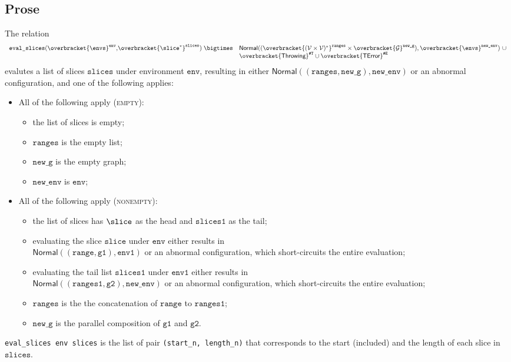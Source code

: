 \documentclass{book}
\newcommand\overname[2]{\overbracket{#1}^{#2}}
\newcommand\XGraphs[0]{\mathcal{G}}
\newcommand\vals[0]{\mathcal{V}}
\newcommand\aslrel[0]{\bigtimes}
\newcommand\aslsep[0]{\mathbf{,}}
\newcommand\ThrowingConfig[0]{\texttt{\#T}}
\newcommand\ErrorConfig[0]{\texttt{\#E}}
\newcommand\ProseOrAbnormal[0]{or an abnormal configuration, which short-circuits the entire evaluation}
\newcommand\TError[0]{\textsf{TError}}
\newcommand\evalslices[1]{\texttt{eval\_slices}(#1)}
\newcommand\Normal[0]{\textsf{Normal}}
\newcommand\Throwing[0]{\textsf{Throwing}}
\newcommand\newenv[0]{\texttt{new\_env}}
\newcommand\env[0]{\texttt{env}}
\newcommand\envone[0]{\texttt{env1}}
\newcommand\newg[0]{\texttt{new\_g}}
\newcommand\vgone[0]{\texttt{g1}}
\newcommand\vgtwo[0]{\texttt{g2}}
\newcommand\vslice[0]{\texttt{slice}}
\newcommand\slices[0]{\texttt{slices}}
\newcommand\slicesone[0]{\texttt{slices1}}
\newcommand\range[0]{\texttt{range}}
\newcommand\ranges[0]{\texttt{ranges}}
\newcommand\rangesone[0]{\texttt{ranges1}}
\begin{document}
\subsection{Prose}
The relation
\[
  \begin{array}{rl}
  \evalslices{\overname{\envs}{\env} \aslsep \overname{\slice^*}{\slices}} \;\aslrel &
    \Normal((\overname{(\vals \times \vals)^*}{\ranges} \times \overname{\XGraphs}{\newg}), \overname{\envs}{\newenv})\ \cup \\
    & \overname{\Throwing}{\ThrowingConfig} \cup \overname{\TError}{\ErrorConfig}
  \end{array}
\]
evalutes a list of slices $\slices$ under environment $\env$, resulting in either
$\Normal((\ranges, \newg), \newenv)$ or an abnormal configuration,
and one of the following applies:
\begin{itemize}
  \item All of the following apply (\textsc{empty}):
  \begin{itemize}
    \item the list of slices is empty;
    \item $\ranges$ is the empty list;
    \item $\newg$ is the empty graph;
    \item $\newenv$ is $\env$;
  \end{itemize}

  \item All of the following apply (\textsc{nonempty}):
  \begin{itemize}
    \item the list of slices has $\slice$ as the head and $\slicesone$ as the tail;
    \item evaluating the slice $\vslice$ under $\env$ either results in \\
    $\Normal((\range, \vgone), \envone)$     \ProseOrAbnormal;
    \item evaluating the tail list $\slicesone$ under $\envone$ either results in \\
    $\Normal((\rangesone, \vgtwo), \newenv)$ \ProseOrAbnormal;
    \item $\ranges$ is the the concatenation of $\range$ to $\rangesone$;
    \item $\newg$ is the parallel composition of $\vgone$ and $\vgtwo$.
  \end{itemize}
\end{itemize}

\texttt{eval\_slices env slices} is the list of pair \texttt{(start\_n, length\_n)} that
corresponds to the start (included) and the length of each slice in
$\slices$.
\end{document}
